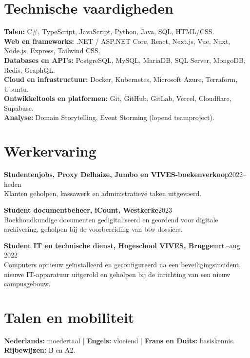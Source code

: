 \documentclass[a4paper,10pt]{article}
\newcommand{\entry}[3]{\textbf{#1}\hfill #2\\#3\par}
\begin{document}
\section{Technische vaardigheden}
\textbf{Talen:} C\#, TypeScript, JavaScript, Python, Java, SQL, HTML/CSS.\\
\textbf{Web en frameworks:} .NET / ASP.NET Core, React, Next.js, Vue, Nuxt, Node.js, Express, Tailwind CSS.\\
\textbf{Databases en API's:} PostgreSQL, MySQL, MariaDB, SQL Server, MongoDB, Redis, GraphQL.\\
\textbf{Cloud en infrastructuur:} Docker, Kubernetes, Microsoft Azure, Terraform, Ubuntu.\\
\textbf{Ontwikkeltools en platformen:} Git, GitHub, GitLab, Vercel, Cloudflare, Supabase.\\
\textbf{Analyse:} Domain Storytelling, Event Storming (lopend teamproject).

\section{Werkervaring}
\entry{Studentenjobs, Proxy Delhaize, Jumbo en VIVES-boekenverkoop}{2022--heden}{Klanten geholpen, kassawerk en administratieve taken uitgevoerd.}
\entry{Student documentbeheer, iCount, Westkerke}{2023}{Boekhoudkundige documenten gedigitaliseerd en geordend voor digitale archivering, geholpen bij de voorbereiding van btw-dossiers.}
\entry{Student IT en technische dienst, Hogeschool VIVES, Brugge}{mrt.--aug. 2022}{Computers opnieuw geïnstalleerd en geconfigureerd na een beveiligingsincident, nieuwe IT-apparatuur uitgerold en geholpen bij de inrichting van een nieuw campusgebouw.}

\section{Talen en mobiliteit}
\textbf{Nederlands:} moedertaal \enspace | \enspace \textbf{Engels:} vloeiend \enspace | \enspace \textbf{Frans en Duits:} basiskennis.\\
\textbf{Rijbewijzen:} B en A2.
\end{document}
